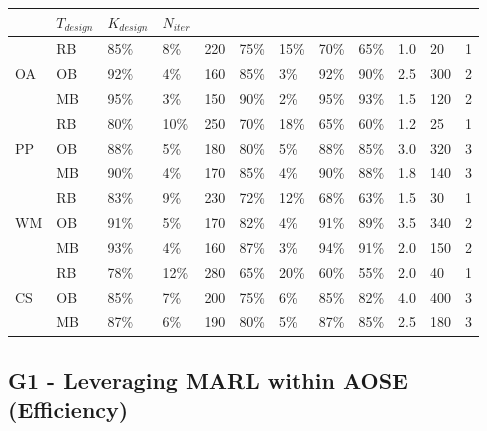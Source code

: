 \documentclass[pdflatex,sn-mathphys-num]{sn-jnl}%
\theoremstyle{thmstyleone}%
\theoremstyle{thmstyletwo}%
\theoremstyle{thmstylethree}%
\begin{document}
\begin{table}[h!]
\begin{tabular}{p{0.5cm}|p{1cm}|p{0.4cm}p{0.3cm}p{0.3cm}p{0.85cm}|p{0.4cm}p{0.4cm}p{0.55cm}|p{0.8cm}p{0.8cm}p{0.8cm}}
                      & $T_{design}$    & $K_{design}$ & $N_{iter}$                                                            \\
        \hline
        \multirow{3}{*}{OA}
                      & RB              & 85\%         & 8\%        & 220          & 75\% & 15\% & 70\% & 65\% & 1.0 & 20  & 1 \\
                      & OB              & 92\%         & 4\%        & 160          & 85\% & 3\%  & 92\% & 90\% & 2.5 & 300 & 2 \\
                      & MB              & 95\%         & 3\%        & 150          & 90\% & 2\%  & 95\% & 93\% & 1.5 & 120 & 2 \\
        \hline
        \multirow{3}{*}{PP}
                      & RB              & 80\%         & 10\%       & 250          & 70\% & 18\% & 65\% & 60\% & 1.2 & 25  & 1 \\
                      & OB              & 88\%         & 5\%        & 180          & 80\% & 5\%  & 88\% & 85\% & 3.0 & 320 & 3 \\
                      & MB              & 90\%         & 4\%        & 170          & 85\% & 4\%  & 90\% & 88\% & 1.8 & 140 & 3 \\
        \hline
        \multirow{3}{*}{WM}
                      & RB              & 83\%         & 9\%        & 230          & 72\% & 12\% & 68\% & 63\% & 1.5 & 30  & 1 \\
                      & OB              & 91\%         & 5\%        & 170          & 82\% & 4\%  & 91\% & 89\% & 3.5 & 340 & 2 \\
                      & MB              & 93\%         & 4\%        & 160          & 87\% & 3\%  & 94\% & 91\% & 2.0 & 150 & 2 \\
        \hline
        \multirow{3}{*}{CS}
                      & RB              & 78\%         & 12\%       & 280          & 65\% & 20\% & 60\% & 55\% & 2.0 & 40  & 1 \\
                      & OB              & 85\%         & 7\%        & 200          & 75\% & 6\%  & 85\% & 82\% & 4.0 & 400 & 3 \\
                      & MB              & 87\%         & 6\%        & 190          & 80\% & 5\%  & 87\% & 85\% & 2.5 & 180 & 3 \\
        \hline
    \end{tabular}
    \label{tab:g1_g2_g3_g4}
\end{table}
\subsection{G1 - Leveraging MARL within AOSE (Efficiency)}
\end{document}
